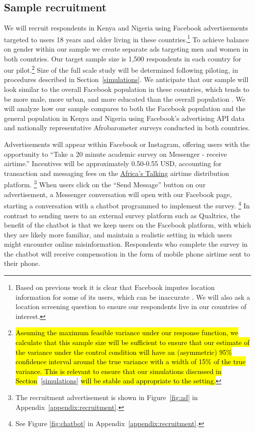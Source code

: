 \documentclass[letterpaper, 12pt, parskip=full,]{scrartcl}
\begin{document}
\subsection{Sample recruitment}
We will recruit respondents in Kenya and Nigeria using Facebook advertisements targeted to users 18 years and older living in these countries.\footnote{Based on previous work it is clear that Facebook imputes location information for some of its users, which can be inaccurate \citep{Rosenzweig_2020}. We will also ask a location screening question to ensure our respondents live in our countries of interest.} %
To achieve balance on gender within our sample we create separate ads targeting men and women in both countries. Our target sample size is 1,500 respondents in each country for our pilot.\footnote{\hl{Assuming the maximum feasible variance under our response function, we calculate that this sample size will be sufficient to ensure that our estimate of the variance under the control condition will have an (asymmetric) 95\% confidence interval around the true variance with a width of 15\% of the true variance. This is relevant to ensure that our simulations discussed in Section}~\ref{simulations}\hl{ will be stable and appropriate to the setting.}} Size of the full scale study will be determined following piloting, in procedures described in Section~\ref{simulations}. We anticipate that our sample will look similar to the overall Facebook population in these countries, which tends to be more male, more urban, and more educated than the overall population \citep{Rosenzweig_2020}. We will analyze how our sample compares to both the Facebook population and the general population in Kenya and Nigeria using Facebook's advertising API data and nationally representative Afrobarometer surveys conducted in both countries. 


Advertisements will appear within Facebook or Instagram, offering users with the opportunity to ``Take a 20 minute academic survey on Messenger - receive airtime.'' Incentives will be approximately 0.50-0.55 USD, accounting for transaction and messaging fees on the \href{https://africastalking.com/}{Africa's Talking} airtime distribution platform.%
\footnote{The recruitment advertisement is shown in Figure~\ref{fig:ad} in Appendix~\ref{appendix:recruitment}.} %
 When users click on the ``Send Message'' button on our advertisement, a Messenger conversation will open with our Facebook page, starting a conversation with a chatbot programmed to implement the survey.%
 \footnote{See Figure \ref{fig:chatbot} in Appendix~\ref{appendix:recruitment}.} %
 In contrast to sending users to an external survey platform such as Qualtrics, the benefit of the chatbot is that we keep users on the Facebook platform, with which they are likely more familiar, and maintain a realistic setting in which users might encounter online misinformation.  Respondents who complete the survey in the chatbot will receive compensation in the form of mobile phone airtime sent to their phone. %
\end{document}
